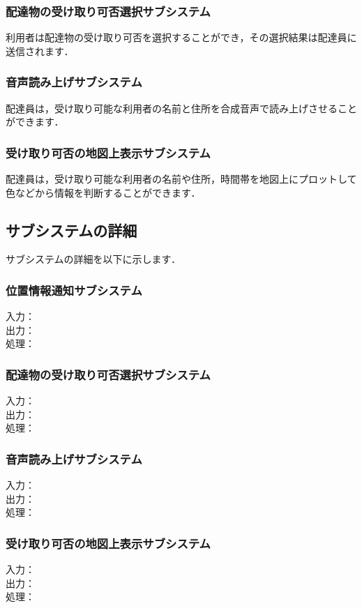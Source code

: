 \documentclass[a4j,titlepage]{jarticle}
\begin{document}
\subsubsection{配達物の受け取り可否選択サブシステム}
利用者は配達物の受け取り可否を選択することができ，その選択結果は配達員に送信されます．

\subsubsection{音声読み上げサブシステム}
配達員は，受け取り可能な利用者の名前と住所を合成音声で読み上げさせることができます．

\subsubsection{受け取り可否の地図上表示サブシステム}
配達員は，受け取り可能な利用者の名前や住所，時間帯を地図上にプロットして色などから情報を判断することができます．

\subsection{サブシステムの詳細}
サブシステムの詳細を以下に示します．

\subsubsection{位置情報通知サブシステム}
入力：\\
出力：\\
処理：

\subsubsection{配達物の受け取り可否選択サブシステム}
入力：\\
出力：\\
処理：

\subsubsection{音声読み上げサブシステム}
入力：\\
出力：\\
処理：

\subsubsection{受け取り可否の地図上表示サブシステム}
入力：\\
出力：\\
処理：
\end{document}
